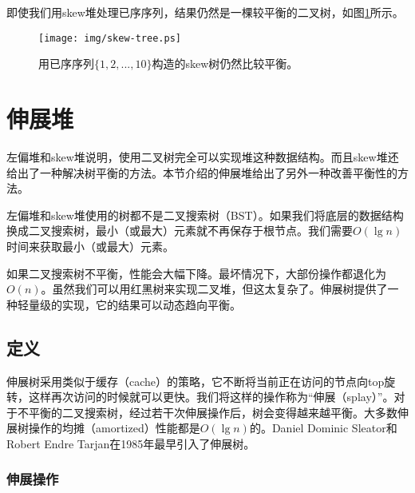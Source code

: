 \documentclass[UTF8]{article}
\begin{document}
即使我们用skew堆处理已序序列，结果仍然是一棵较平衡的二叉树，如图\ref{fig:skew-tree}所示。

\begin{figure}[htbp]
   \begin{center}
   	  \texttt{[image: img/skew-tree.ps]}
    \caption{用已序序列$\{1, 2, ..., 10\}$构造的skew树仍然比较平衡。}
    \label{fig:skew-tree}
   \end{center}
\end{figure}



\section{伸展堆}
\label{splayheap}

左偏堆和skew堆说明，使用二叉树完全可以实现堆这种数据结构。而且skew堆还给出了一种解决树平衡的方法。本节介绍的伸展堆给出了另外一种改善平衡性的方法。

左偏堆和skew堆使用的树都不是二叉搜索树（BST）。如果我们将底层的数据结构换成二叉搜索树，最小（或最大）元素就不再保存于根节点。我们需要$O(\lg n)$时间来获取最小（或最大）元素。

如果二叉搜索树不平衡，性能会大幅下降。最坏情况下，大部份操作都退化为$O(n)$。虽然我们可以用红黑树来实现二叉堆，但这太复杂了。伸展树提供了一种轻量级的实现，它的结果可以动态趋向平衡。


\subsection{定义}

伸展树采用类似于缓存（cache）的策略，它不断将当前正在访问的节点向top旋转，这样再次访问的时候就可以更快。我们将这样的操作称为“伸展（splay）”。对于不平衡的二叉搜索树，经过若干次伸展操作后，树会变得越来越平衡。大多数伸展树操作的均摊（amortized）性能都是$O(\lg n)$的。Daniel Dominic Sleator和Robert Endre Tarjan在1985年最早引入了伸展树\cite{wiki-splay-tree}\cite{self-adjusting-trees}。

\subsubsection{伸展操作}
\end{document}
